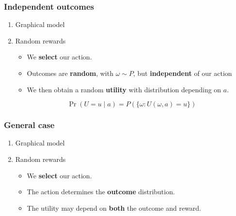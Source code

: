 \documentclass[smaller]{article}
\begin{document}
\subsubsection{Independent outcomes}
\label{sec:org2bb79d3}

\begin{enumerate}
\item Graphical model
\label{sec:org7a233f2}
\begin{center}
\end{center}

\item Random rewards
\label{sec:org0118221}
\begin{itemize}
\item We \textbf{select} our action.
\item Outcomes are \textbf{random}, with \(\omega \sim P\), but \textbf{independent} of our action
\item We then obtain a random \textbf{utility} with distribution depending on \(a\).
\end{itemize}
\[
\Pr(U = u \mid a) = P(\{\omega : U(\omega, a) = u\})
\]
\end{enumerate}


\subsubsection{General case}
\label{sec:org57a043e}
\begin{enumerate}
\item Graphical model
\label{sec:org2add978}
\begin{center}
\end{center}
\item Random rewards
\label{sec:org60dae85}
\begin{itemize}
\item We \textbf{select} our action.
\item The action determines the \textbf{outcome} distribution.
\item The utility may depend on \textbf{both} the outcome and reward.
\end{itemize}
\end{enumerate}
\end{document}
